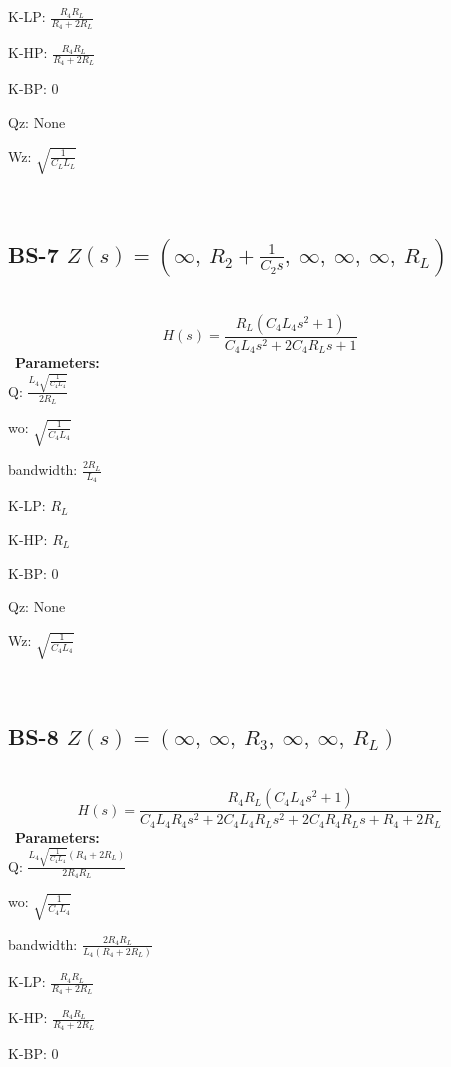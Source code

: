 \documentclass{article}
\begin{document}
K-LP: $\frac{R_{4} R_{L}}{R_{4} + 2 R_{L}}$\ 

K-HP: $\frac{R_{4} R_{L}}{R_{4} + 2 R_{L}}$\ 

K-BP: $0$\ 

Qz: $\text{None}$\ 

Wz: $\sqrt{\frac{1}{C_{L} L_{L}}}$\ 

\ 

\subsection{BS-7 $Z(s) = \left( \infty, \  R_{2} + \frac{1}{C_{2} s}, \  \infty, \  \infty, \  \infty, \  R_{L}\right)$ } \ 
\textbf{\[H(s) = \frac{R_{L} \left(C_{4} L_{4} s^{2} + 1\right)}{C_{4} L_{4} s^{2} + 2 C_{4} R_{L} s + 1}\] } \ 
\textbf{Parameters:}\\ 

Q: $\frac{L_{4} \sqrt{\frac{1}{C_{4} L_{4}}}}{2 R_{L}}$\ 

wo: $\sqrt{\frac{1}{C_{4} L_{4}}}$\ 

bandwidth: $\frac{2 R_{L}}{L_{4}}$\ 

K-LP: $R_{L}$\ 

K-HP: $R_{L}$\ 

K-BP: $0$\ 

Qz: $\text{None}$\ 

Wz: $\sqrt{\frac{1}{C_{4} L_{4}}}$\ 

\ 

\subsection{BS-8 $Z(s) = \left( \infty, \  \infty, \  R_{3}, \  \infty, \  \infty, \  R_{L}\right)$ } \ 
\textbf{\[H(s) = \frac{R_{4} R_{L} \left(C_{4} L_{4} s^{2} + 1\right)}{C_{4} L_{4} R_{4} s^{2} + 2 C_{4} L_{4} R_{L} s^{2} + 2 C_{4} R_{4} R_{L} s + R_{4} + 2 R_{L}}\] } \ 
\textbf{Parameters:}\\ 

Q: $\frac{L_{4} \sqrt{\frac{1}{C_{4} L_{4}}} \left(R_{4} + 2 R_{L}\right)}{2 R_{4} R_{L}}$\ 

wo: $\sqrt{\frac{1}{C_{4} L_{4}}}$\ 

bandwidth: $\frac{2 R_{4} R_{L}}{L_{4} \left(R_{4} + 2 R_{L}\right)}$\ 

K-LP: $\frac{R_{4} R_{L}}{R_{4} + 2 R_{L}}$\ 

K-HP: $\frac{R_{4} R_{L}}{R_{4} + 2 R_{L}}$\ 

K-BP: $0$\ 
\end{document}
